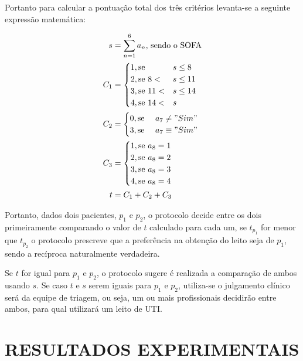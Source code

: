 \documentclass[12pt]{article}
\begin{document}
Portanto para calcular a pontuação total dos três critérios levanta-se a seguinte expressão matemática:

\[
\begin{split}
    s &= \sum_{n=1}^{6} a_n\text{, sendo o SOFA} \\
    C_1 &= \begin{cases}
        1, \text{se } & s \le 8 \\
        2, \text{se } 8 < & s \le 11 \\
        3, \text{se } 11 < & s \le  14 \\
        4, \text{se } 14 < & s \\
    \end{cases} \\
    C_2 &= \begin{cases}
        0, \text{se } & a_7 \neq "Sim" \\
        3, \text{se } & a_7 \equiv "Sim" \\
    \end{cases} \\
    C_3 &= \begin{cases}
        1, \text{se } a_8 = 1 \\
        2, \text{se } a_8 = 2 \\
        3, \text{se } a_8 = 3 \\
        4, \text{se } a_8 = 4 \\
    \end{cases} \\
    t &= C_1 + C_2 + C_3 \\
\end{split}
\] 

Portanto, dados dois pacientes, $p_1$ e $p_2$, o protocolo decide entre os dois primeiramente comparando o valor de $t$ calculado para cada um, se  $t_{p_1}$ for menor que $t_{p_2}$ o protocolo prescreve que a preferência na obtenção do leito seja de $p_1$, sendo a recíproca naturalmente verdadeira.

Se $t$ for igual para $p_1$ e $p_2$, o protocolo sugere é realizada a comparação de ambos usando $s$. Se caso $t$ e $s$ serem iguais para $p_1$ e $p_2$, utiliza-se o julgamento clínico será da equipe de triagem, ou seja, um ou mais profissionais decidirão entre ambos, para qual utilizará um leito de UTI.


\section{RESULTADOS EXPERIMENTAIS}
\end{document}
